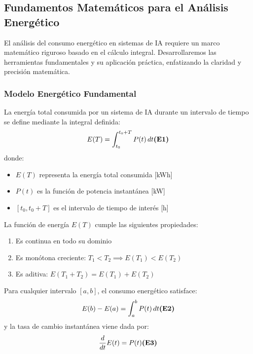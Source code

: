 \subsection{Fundamentos Matemáticos para el Análisis Energético}

El análisis del consumo energético en sistemas de IA requiere un marco matemático riguroso basado en el cálculo integral. Desarrollaremos las herramientas fundamentales y su aplicación práctica, enfatizando la claridad y precisión matemática.

\subsubsection{Modelo Energético Fundamental}

\begin{definicion}
La energía total consumida por un sistema de IA durante un intervalo de tiempo se define mediante la integral definida:
\begin{equation}
    E(T) = \int_{t_0}^{t_0+T} P(t)\,dt \textbf{(E1)}
\end{equation}
donde:
\begin{itemize}
    \item $E(T)$ representa la energía total consumida [kWh]
    \item $P(t)$ es la función de potencia instantánea [kW]
    \item $[t_0, t_0+T]$ es el intervalo de tiempo de interés [h]
\end{itemize}
\end{definicion}

\begin{lema}
La función de energía $E(T)$ cumple las siguientes propiedades:
\begin{enumerate}
    \item Es continua en todo su dominio
    \item Es monótona creciente: $T_1 < T_2 \implies E(T_1) < E(T_2)$
    \item Es aditiva: $E(T_1 + T_2) = E(T_1) + E(T_2)$
\end{enumerate}
\end{lema}

\begin{teorema}
Para cualquier intervalo $[a,b]$, el consumo energético satisface:
\begin{equation}
    E(b) - E(a) = \int_a^b P(t)\,dt \textbf{(E2)}
\end{equation}
y la tasa de cambio instantánea viene dada por:
\begin{equation}
    \frac{d}{dt}E(t) = P(t) \textbf{(E3)}
\end{equation}
\end{teorema}

